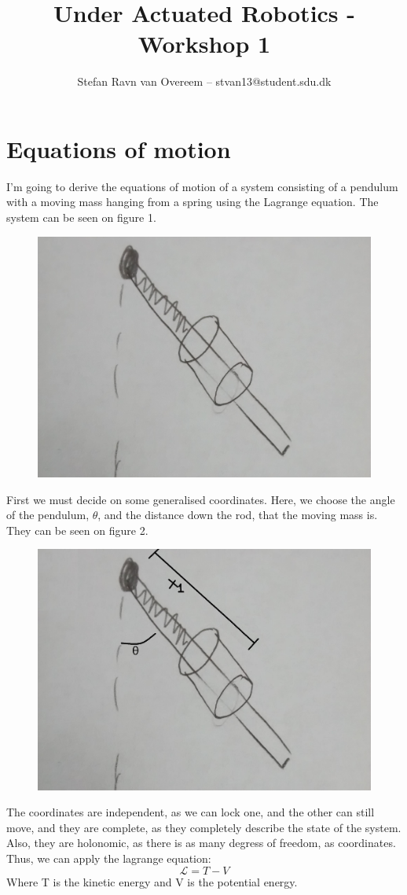 \documentclass[a4paper,12pt,english]{article}
\title{\textbf{Under Actuated Robotics - Workshop 1}}
\author{Stefan Ravn van Overeem – stvan13@student.sdu.dk}
\begin{document}
\maketitle
\newpage
\section{Equations of motion}
I'm going to derive the equations of motion of a system consisting of a pendulum with a moving mass hanging from a spring using the Lagrange equation. The system can be seen on figure 1.
		\begin{figure}[H]
			\centering
			\includegraphics[scale=0.13]{system.jpg}
			\caption{}
		\end{figure}

First we must decide on some generalised coordinates. Here, we choose the angle of the pendulum, $\theta$, and the distance down the rod, that the moving mass is. They can be seen on figure 2.
		\begin{figure}[H]
			\centering
			\includegraphics[scale=0.13]{systemcoordinates.jpg}
			\caption{}
		\end{figure}
The coordinates are independent, as we can lock one, and the other can still move, and they are complete, as they completely describe the state of the system. Also, they are holonomic, as there is as many degress of freedom, as coordinates.
Thus, we can apply the lagrange equation:
$$\mathscr{L} = T - V$$
Where T is the kinetic energy and V is the potential energy.
\end{document}
